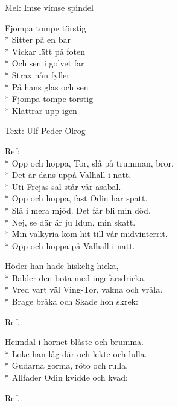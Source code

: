 \begin{SongText}
    \begin{SongInfo}
        Mel: Imse vimse spindel
    \end{SongInfo}
    \begin{SongVerse}
        Fjompa tompe törstig\\*%
        Sitter på en bar\\*%
        Vickar lätt på foten\\*%
        Och sen i golvet far\\*%
        Strax nån fyller\\*%
        På hans glas och sen\\*%
        Fjompa tompe törstig\\*%
        Klättrar upp igen
    \end{SongVerse}
\end{SongText}
\begin{SongText}
    \begin{SongInfo}
        Text: Ulf Peder Olrog
    \end{SongInfo}
    \begin{SongVerse}
        Ref:\\*%
        Opp och hoppa, Tor, slå på trumman, bror.\\*%
        Det är dans uppå Valhall i natt.\\*%
        Uti Frejas sal står vår asabal.\\*%
        Opp och hoppa, fast Odin har spatt.\\*%
        Slå i mera mjöd. Det får bli min död.\\*%
        Nej, se där är ju Idun, min skatt.\\*%
        Min valkyria kom hit till vår midvinterrit.\\*%
        Opp och hoppa på Valhall i natt.
    \end{SongVerse}
    \begin{SongVerse}
        Höder han hade hiskelig hicka,\\*%
        Balder den bota med ingefärsdricka.\\*%
        Vred vart väl Ving-Tor, vakna och vråla.\\*%
        Brage bråka och Skade hon skrek:
    \end{SongVerse}
    \begin{SongVerse}
        Ref..
    \end{SongVerse}
    \begin{SongVerse}
        Heimdal i hornet blåste och brumma.\\*%
        Loke han låg där och lekte och lulla.\\*%
        Gudarna gorma, röto och rulla.\\*%
        Allfader Odin kvidde och kvad:
    \end{SongVerse}
    \begin{SongVerse}
        Ref..
    \end{SongVerse}
\end{SongText}
